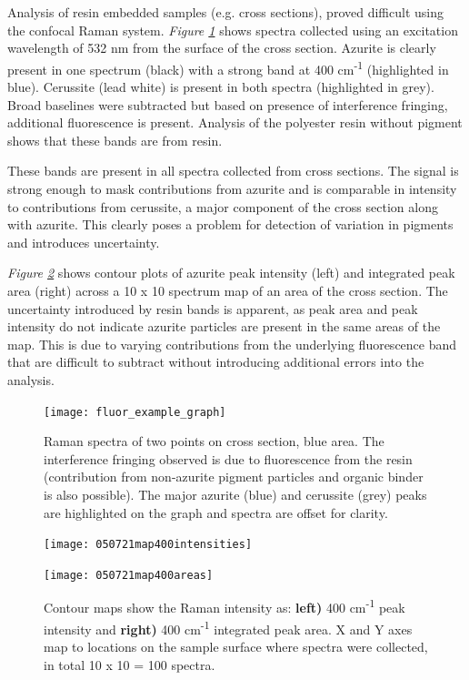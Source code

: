 Analysis of resin embedded samples (e.g. cross sections), proved difficult using the confocal Raman system. \textit{Figure \ref{fig:fluor_example_graph}} shows spectra collected using an excitation wavelength of 532 nm from the surface of the cross section. Azurite is clearly present in one spectrum (black) with a strong band at 400 cm\textsuperscript{-1} (highlighted in blue). Cerussite (lead white) is present in both spectra (highlighted in grey). Broad baselines were subtracted but based on presence of interference fringing, additional fluorescence is present. Analysis of the polyester resin without pigment shows that these bands are from resin.

These bands are present in all spectra collected from cross sections. The signal is strong enough to mask contributions from azurite and is comparable in intensity to contributions from cerussite, a major component of the cross section along with azurite. This clearly poses a problem for detection of variation in pigments and introduces uncertainty.

\textit{Figure \ref{fig:contours_xsection}} shows contour plots of azurite peak intensity (left) and integrated peak area (right) across a 10 x 10 spectrum map of an area of the cross section. The uncertainty introduced by resin bands is apparent, as peak area and peak intensity do not indicate azurite particles are present in the same areas of the map. This is due to varying contributions from the underlying fluorescence band that are difficult to subtract without introducing additional errors into the analysis.

\begin{figure}[H]
\centering
  \texttt{[image: fluor\_example\_graph]}
\caption[Raman spectra of cross section]{Raman spectra of two points on cross section, blue area. The interference fringing observed is due to fluorescence from the resin (contribution from non-azurite pigment particles and organic binder is also possible). The major azurite (blue) and cerussite (grey) peaks are highlighted on the graph and spectra are offset for clarity.}
\label{fig:fluor_example_graph}
\end{figure}


\begin{figure}[H]
\centering
\begin{minipage}{.45\textwidth}
  \centering
  \texttt{[image: 050721map400intensities]}
\end{minipage}
\begin{minipage}{.45\textwidth}
  \centering
  \texttt{[image: 050721map400areas]}
\end{minipage}
\caption[Contour maps, azurite Raman intensity in cross section]{Contour maps show the Raman intensity as: \textbf{left)} 400 cm\textsuperscript{-1} peak intensity and \textbf{right)} 400 cm\textsuperscript{-1} integrated peak area. X and Y axes map to locations on the sample surface where spectra were collected, in total 10 x 10 = 100 spectra.}
\label{fig:contours_xsection}
\end{figure}

